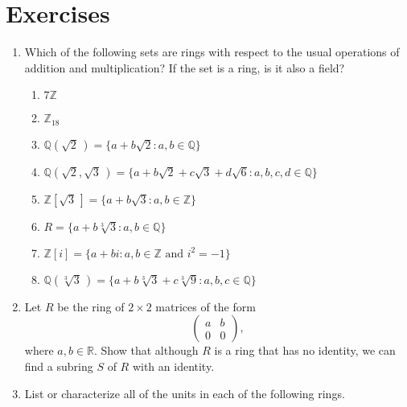  
 
\section*{Exercises}
\exrule
 
 
{\small
\begin{enumerate}
 
 
\item
Which of the following sets are rings with respect to the usual
operations of addition and multiplication?  If the set is a ring, is
it also a field?
\begin{enumerate}
 
 \item
$7 {\mathbb Z}$
 
 \item
${\mathbb Z}_{18}$
 
 \item
${\mathbb Q} ( \sqrt{2}\, ) = \{a + b \sqrt{2} : a, b \in {\mathbb Q}\}$
 
 \item
${\mathbb Q} ( \sqrt{2}, \sqrt{3}\, ) = \{a + b \sqrt{2} + c \sqrt{3} + d
\sqrt{6} :  a, b, c, d \in {\mathbb Q}\}$
 
 \item
${\mathbb Z}[\sqrt{3}\, ] = \{ a + b \sqrt{3} : a, b \in {\mathbb Z} \}$
 
 \item
$R = \{a + b \sqrt[3]{3} : a, b \in {\mathbb Q} \}$
 
 \item
${\mathbb Z}[ i ] = \{ a + b i : a, b \in {\mathbb Z} \text{ and } i^2 = -1 \}$
 
 \item
${\mathbb Q}( \sqrt[3]{3}\, ) = \{ a + b \sqrt[3]{3} + c \sqrt[3]{9} : a, b,
c \in {\mathbb Q} \}$ 
 
\end{enumerate}
 
 
\item
Let $R$ be the ring of $2 \times 2$ matrices of the form
\[
\begin{pmatrix}
a & b \\
0 & 0
\end{pmatrix},
\]
where $a, b \in {\mathbb R}$.  Show that although $R$ is a ring that has no
identity, we can find a subring $S$ of $R$ with an identity.
 
 
\item
List or characterize all of the units in each of the following rings.
\begin{enumerate}
 

\end{enumerate}
\end{enumerate}}
